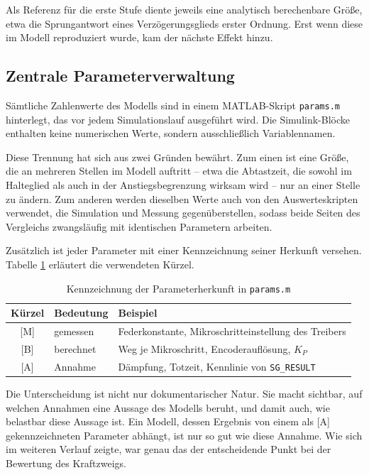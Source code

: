 Als Referenz für die erste Stufe diente jeweils eine analytisch berechenbare Größe, etwa
die Sprungantwort eines Verzögerungsglieds erster Ordnung. Erst wenn diese im Modell
reproduziert wurde, kam der nächste Effekt hinzu.

\subsection*{Zentrale Parameterverwaltung}

Sämtliche Zahlenwerte des Modells sind in einem MATLAB-Skript \texttt{params.m}
hinterlegt, das vor jedem Simulationslauf ausgeführt wird. Die Simulink-Blöcke enthalten
keine numerischen Werte, sondern ausschließlich Variablennamen.

Diese Trennung hat sich aus zwei Gründen bewährt. Zum einen ist eine Größe, die an
mehreren Stellen im Modell auftritt -- etwa die Abtastzeit, die sowohl im Halteglied als
auch in der Anstiegsbegrenzung wirksam wird -- nur an einer Stelle zu ändern. Zum anderen
werden dieselben Werte auch von den Auswerteskripten verwendet, die Simulation und
Messung gegenüberstellen, sodass beide Seiten des Vergleichs zwangsläufig mit identischen
Parametern arbeiten.

Zusätzlich ist jeder Parameter mit einer Kennzeichnung seiner Herkunft versehen. Tabelle
\ref{tab:parameterstatus} erläutert die verwendeten Kürzel.

\begin{table}[htbp]
    \centering
    \caption{Kennzeichnung der Parameterherkunft in \texttt{params.m}}
    \label{tab:parameterstatus}
    \begin{tabular}{clp{8cm}}
        \hline
        Kürzel & Bedeutung & Beispiel \\
        \hline
        {[M]} & gemessen  & Federkonstante, Mikroschritteinstellung des Treibers \\
        {[B]} & berechnet & Weg je Mikroschritt, Encoderauflösung, $K_P$ \\
        {[A]} & Annahme   & Dämpfung, Totzeit, Kennlinie von \texttt{SG\_RESULT} \\
        \hline
    \end{tabular}
\end{table}

Die Unterscheidung ist nicht nur dokumentarischer Natur. Sie macht sichtbar, auf welchen
Annahmen eine Aussage des Modells beruht, und damit auch, wie belastbar diese Aussage
ist. Ein Modell, dessen Ergebnis von einem als [A] gekennzeichneten Parameter abhängt,
ist nur so gut wie diese Annahme. Wie sich im weiteren Verlauf zeigte, war genau das der
entscheidende Punkt bei der Bewertung des Kraftzweigs.

